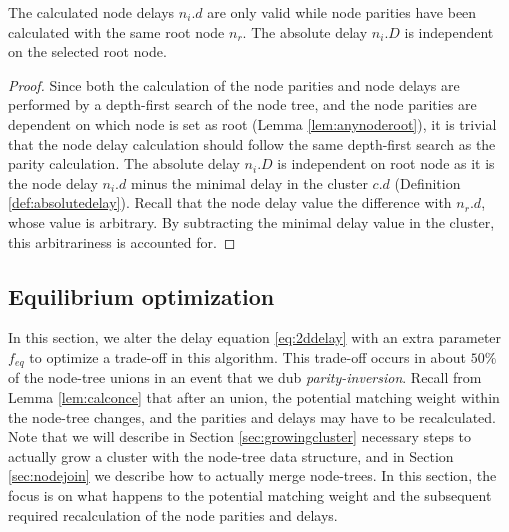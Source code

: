 \begin{lemma}\label{lem:nodecalc_ancestrypath}
  The calculated node delays $n_i.d$ are only valid while node parities have been calculated with the same root node $n_r$. The absolute delay $n_i.D$ is independent on the selected root node. 
\end{lemma}
\begin{proof}
  Since both the calculation of the node parities and node delays are performed by a depth-first search of the node tree, and the node parities are dependent on which node is set as root (Lemma \ref{lem:anynoderoot}), it is trivial that the node delay calculation should follow the same depth-first search as the parity calculation. The absolute delay $n_i.D$ is independent on root node as it is the node delay $n_i.d$ minus the minimal delay in the cluster $c.d$ (Definition \ref{def:absolutedelay}). Recall that the node delay value the difference with $n_r.d$, whose value is arbitrary. By subtracting the minimal delay value in the cluster, this arbitrariness is accounted for. 
\end{proof}



\subsection{Equilibrium optimization}\label{sec:bbstate}

In this section, we alter the delay equation \eqref{eq:2ddelay} with an extra parameter $f_{eq}$ to optimize a trade-off in this algorithm. This trade-off occurs in about $50\%$ of the node-tree unions in an event that we dub \emph{parity-inversion}. Recall from Lemma \ref{lem:calconce} that after an union, the potential matching weight within the node-tree changes, and the parities and delays may have to be recalculated. Note that we will describe in Section \ref{sec:growingcluster} necessary steps to actually grow a cluster with the node-tree data structure, and in Section \ref{sec:nodejoin} we describe how to actually merge node-trees. In this section, the focus is on what happens to the potential matching weight and the subsequent required recalculation of the node parities and delays. 

